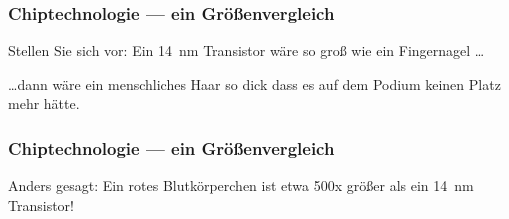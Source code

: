 

\begin{frame}
	\frametitle{Chiptechnologie --- ein Größenvergleich}
	\begin{exampleblock}{Stellen Sie sich vor:}
		Ein \SI{14}{\nano\meter} Transistor %
		wäre so groß wie ein Fingernagel %
		\ldots\\

		\pause

		\bigskip
		\ldots dann wäre ein menschliches Haar %
                so dick dass es auf dem Podium keinen Platz mehr hätte. %

	\end{exampleblock}

\end{frame}

\begin{frame}
	\frametitle{Chiptechnologie --- ein Größenvergleich}
	\begin{exampleblock}{Anders gesagt:}
		Ein rotes Blutkörperchen ist etwa 500x größer als ein \SI{14}{\nano\meter} Transistor!

	\end{exampleblock}
\end{frame}

